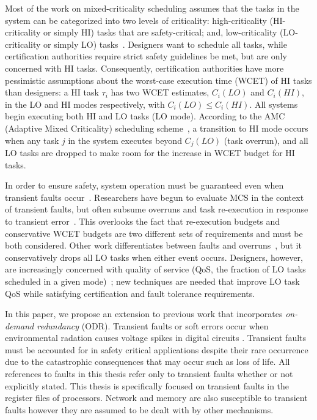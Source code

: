 \documentclass[conference]{IEEEtran}
\begin{document}
Most of the work on mixed-criticality scheduling assumes that the tasks in the system can be categorized into two levels of criticality: high-criticality  (HI-criticality or simply HI) tasks that are safety-critical; and, low-criticality (LO-criticality or simply LO) tasks~\cite{burns2013mixed}.  Designers want to schedule all tasks, while certification authorities require strict safety guidelines be met, but are only concerned with HI tasks. Consequently, certification authorities have more pessimistic assumptions about the worst-case execution time (WCET) of HI tasks than designers: a HI task $\tau_i$ has two WCET estimates, $C_i (LO)$ and $C_i (HI)$, in the LO and HI modes respectively, with $C_i (LO) \le C_i (HI)$. All systems begin executing both HI and LO tasks (LO mode). According to the AMC (Adaptive Mixed Criticality) scheduling scheme~\cite{baruah2011response}, a transition to HI mode occurs when any task $j$ in the system executes beyond $C_j (LO)$ (task overrun), and all LO tasks are dropped to make room for the increase in WCET budget for HI tasks.
	
In order to ensure safety, system operation must be guaranteed even when transient faults occur~\cite{baleani2003}. Researchers have begun to evaluate MCS in the context of transient faults, but often subsume overruns and task re-execution in response to transient error~\cite{kang2014static, huang2014scheduling}. This overlooks the fact that re-execution budgets and conservative WCET budgets are two different sets of requirements and must be both considered. Other work differentiates between faults and overruns~\cite{pathan14}, but it conservatively drops all LO tasks when either event occurs. Designers, however, are increasingly concerned with quality of service (QoS, the fraction of LO tasks scheduled in a given mode)~\cite{yip2014relaxing, burns2013mixed}; new techniques are needed that improve LO task QoS while satisfying certification and fault tolerance requirements.

	
In this paper, we propose an extension to previous work \cite{DATE} that incorporates \emph{on-demand redundancy} (ODR).
Transient faults or soft errors occur when environmental radation causes voltage spikes in digital circuits \cite{Baumann:05}. 
	Transient faults must be accounted for in safety critical applications despite their rare occurrence due to the catastrophic consequences that may occur such as loss of life.
	All references to faults in this thesis refer only to transient faults whether or not explicitly stated. 
	This thesis is specifically focused on transient faults in the register files of processors. 
	Network \cite{radetzki2013methods} and memory \cite{Baumann:05} are also susceptible to transient faults however they are assumed to be dealt with by other mechanisms.
\end{document}
